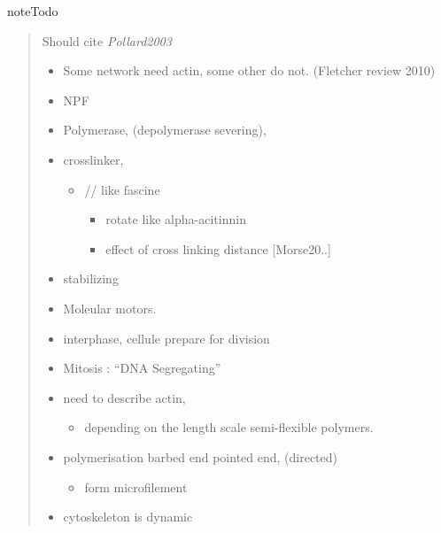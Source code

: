 \documentclass[A4paperpaper,11pt,english]{sphinxmanual}
\begin{document}
\begin{notice}{note}{Todo}
\begin{quote}

Should cite \emph{Pollard2003}
\begin{itemize}
\item {} 
Some network need actin, some other do not. (Fletcher review 2010)

\item {} 
NPF

\item {} 
Polymerase, (depolymerase severing),

\item {} 
crosslinker,
\begin{itemize}
\item {} 
// like fascine
\begin{itemize}
\item {} 
rotate like alpha-acitinnin

\item {} 
effect of cross linking distance {[}Morse20..{]}

\end{itemize}

\end{itemize}

\item {} 
stabilizing

\item {} 
Moleular motors.

\item {} 
interphase, cellule prepare for division

\item {} 
Mitosis : ``DNA Segregating''

\item {} 
need to describe actin,
\begin{itemize}
\item {} 
depending on the length scale semi-flexible polymers.

\end{itemize}

\item {} 
polymerisation barbed end pointed end, (directed)
\begin{itemize}
\item {} 
form microfilement

\end{itemize}

\item {} 
cytoskeleton is dynamic


\end{itemize}
\end{quote}
\end{notice}
\end{document}
